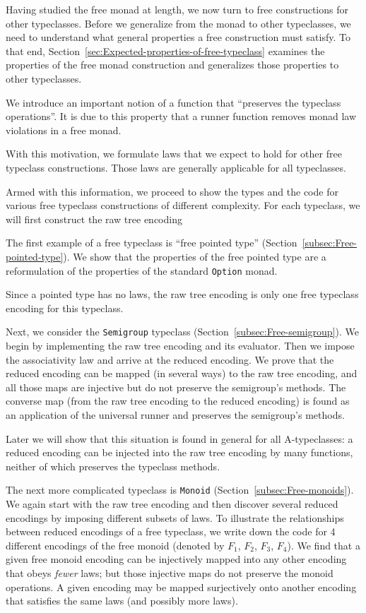 Having studied the free monad at length, we now turn to free constructions
for other typeclasses. Before we generalize from the monad to other
typeclasses, we need to understand what general properties a free
construction must satisfy. To that end, Section~\ref{sec:Expected-properties-of-free-typeclass}
examines the properties of the free monad construction and generalizes
those properties to other typeclasses.

We introduce an important notion of a function that \textsf{``}preserves the
typeclass operations\textsf{''}. It is due to this property that a runner
function removes monad law violations in a free monad. 

With this motivation, we formulate laws that we expect to hold for
other free typeclass constructions. Those laws are generally applicable
for all typeclasses.

Armed with this information, we proceed to show the types and the
code for various free typeclass constructions of different complexity.
For each typeclass, we will first construct the raw tree encoding

The first example of a free typeclass is \textsf{``}free pointed type\textsf{''} (Section~\ref{subsec:Free-pointed-type}).
We show that the properties of the free pointed type are a reformulation
of the properties of the standard \lstinline!Option! monad.

Since a pointed type has no laws, the raw tree encoding is only one
free typeclass encoding for this typeclass.

Next, we consider the \lstinline!Semigroup! typeclass (Section~\ref{subsec:Free-semigroup}).
We begin by implementing the raw tree encoding and its evaluator.
Then we impose the associativity law and arrive at the reduced encoding.
We prove that the reduced encoding can be mapped (in several ways)
to the raw tree encoding, and all those maps are injective but do
not preserve the semigroup\textsf{'}s methods. The converse map (from the raw
tree encoding to the reduced encoding) is found as an application
of the universal runner and preserves the semigroup\textsf{'}s methods.

Later we will show that this situation is found in general for all
A-typeclasses: a reduced encoding can be injected into the raw tree
encoding by many functions, neither of which preserves the typeclass
methods.

The next more complicated typeclass is \lstinline!Monoid! (Section~\ref{subsec:Free-monoids}).
We again start with the raw tree encoding and then discover several
reduced encodings by imposing different subsets of laws. To illustrate
the relationships between reduced encodings of a free typeclass, we
write down the code for 4 different encodings of the free monoid (denoted
by $F_{1}$, $F_{2}$, $F_{3}$, $F_{4}$). We find that a given free
monoid encoding can be injectively mapped into any other encoding
that obeys \emph{fewer} laws; but those injective maps do not preserve
the monoid operations. A given encoding may be mapped surjectively
onto another encoding that satisfies the same laws (and possibly more
laws).

